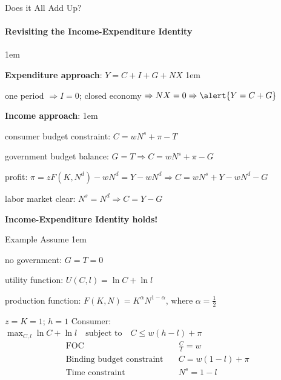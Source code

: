 \documentclass[11pt,aspectratio=43]{beamer}
\let\olditemize=\itemize
\let\endolditemize=\enditemize
\renewenvironment{itemize}{\olditemize \itemsep1em}{\endolditemize}
\let\oldenumerate=\enumerate
\let\endoldenumerate=\endenumerate
\renewenvironment{enumerate}{\oldenumerate \itemsep1em}{ \endoldenumerate}
\theoremstyle{definition}
\begin{document}
\begin{frame}{Does it All Add Up?}
\framesubtitle{Revisiting the Income-Expenditure Identity}
\label{slide:Does_it_All_Add_Up_}
\begin{itemize}
    \item \textbf{Expenditure approach}: $ Y = C + I + G + NX $
    \begin{itemize}
        \item one period $ \Rightarrow I = 0 $; closed economy $ \Rightarrow NX = 0 \Rightarrow  \alert{Y = C + G}$
    \end{itemize}
    \item \textbf{Income approach}:
    \begin{itemize}
        \item \alert{consumer budget constraint}: $ C = w N^{s} + \pi - T $
        \item \alert{government budget balance}: $ G = T \Rightarrow C = w N^{s} + \pi - G $
        \item \alert{profit}: $ \pi = z F( K, N^{d} ) - w N^{d} = Y - w N^{d} \Rightarrow C = w N^{s} + Y - wN^{d} - G $
        \item \alert{labor market clear}: $ N^{s} = N^{d} \Rightarrow C = Y - G$
    \end{itemize}
    \item \textbf{Income-Expenditure Identity holds!}
\end{itemize}
\end{frame}

\begin{frame}{Example}
\label{slide:Example}
    Assume
    \begin{enumerate}
        \item no government: $ G = T = 0 $
        \item utility function: $ U( C, l ) = \ln C + \ln l $
        \item production function: $ F( K, N ) = K^{\alpha}N^{1-\alpha} $, where $ \alpha = \frac{1}{2} $
        \item $ z = K = 1 $; $ h = 1 $
    \end{enumerate}
    Consumer: $ \max_{C, l} \ln C + \ln l \quad \text{subject to} \quad C \le w( h-l ) + \pi $
    \begin{align}
        \text{FOC} \quad
            & \frac{C}{l} = w
            \label{eq:consumerFOC}
        \\
        \text{Binding budget constraint} \quad
            & C = w ( 1-l ) + \pi
            \label{eq:binding_budget}
        \\
        \text{Time constraint} \quad
            & N^{s} = 1 - l
            \label{eq:time_budget}
    \end{align}
\end{frame}
\end{document}
